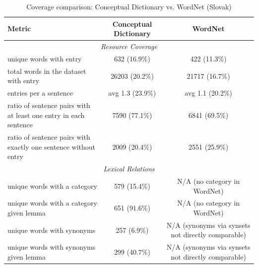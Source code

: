 \begin{table}[htbp]
\centering
\caption{Coverage comparison: Conceptual Dictionary vs. WordNet (Slovak)}
\label{tab:coverage-comparison}
\begin{tabular}{p{5.5cm}cc}
\toprule
\textbf{Metric} & \textbf{Conceptual Dictionary} & \textbf{WordNet} \\
\midrule
\multicolumn{3}{c}{\textit{Resource Coverage}} \\
\midrule
unique words with entry & 632 (16.9\%) & 422 (11.3\%) \\
total words in the dataset with entry & 26203 (20.2\%) & 21717 (16.7\%) \\
entries per a sentence & avg 1.3 (23.9\%) & avg 1.1 (20.2\%) \\
ratio of sentence pairs with at least one entry in each sentence & 7590 (77.1\%) & 6841 (69.5\%) \\
ratio of sentence pairs with exactly one sentence without entry & 2009 (20.4\%) & 2551 (25.9\%) \\
\midrule
\multicolumn{3}{c}{\textit{Lexical Relations}} \\
\midrule
unique words with a category & 579 (15.4\%) & N/A (no category in WordNet) \\
unique words with a category given lemma & 651 (91.6\%) & N/A (no category in WordNet) \\
unique words with synonyms & 257 (6.9\%) & N/A (synonyms via synsets not directly comparable) \\
unique words with synonyms given lemma & 299 (40.7\%) & N/A (synonyms via synsets not directly comparable) \\
\bottomrule
\end{tabular}
\end{table}